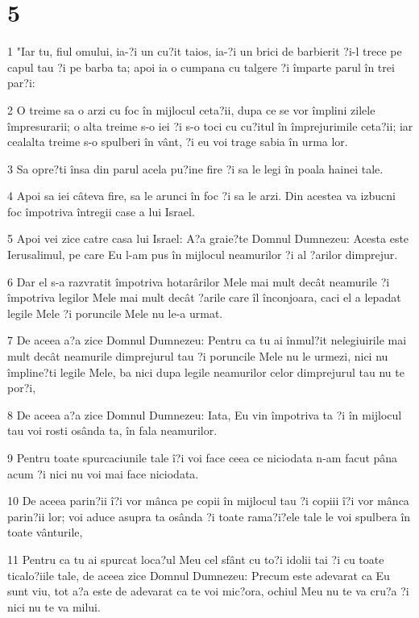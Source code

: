\chapter{5}

\par 1 "Iar tu, fiul omului, ia-?i un cu?it taios, ia-?i un brici de barbierit ?i-l trece pe capul tau ?i pe barba ta; apoi ia o cumpana cu talgere ?i împarte parul în trei par?i:
\par 2 O treime sa o arzi cu foc în mijlocul ceta?ii, dupa ce se vor împlini zilele împresurarii; o alta treime s-o iei ?i s-o toci cu cu?itul în împrejurimile ceta?ii; iar cealalta treime s-o spulberi în vânt, ?i eu voi trage sabia în urma lor.
\par 3 Sa opre?ti însa din parul acela pu?ine fire ?i sa le legi în poala hainei tale.
\par 4 Apoi sa iei câteva fire, sa le arunci în foc ?i sa le arzi. Din acestea va izbucni foc împotriva întregii case a lui Israel.
\par 5 Apoi vei zice catre casa lui Israel: A?a graie?te Domnul Dumnezeu: Acesta este Ierusalimul, pe care Eu l-am pus în mijlocul neamurilor ?i al ?arilor dimprejur.
\par 6 Dar el s-a razvratit împotriva hotarârilor Mele mai mult decât neamurile ?i împotriva legilor Mele mai mult decât ?arile care îl înconjoara, caci el a lepadat legile Mele ?i poruncile Mele nu le-a urmat.
\par 7 De aceea a?a zice Domnul Dumnezeu: Pentru ca tu ai înmul?it nelegiuirile mai mult decât neamurile dimprejurul tau ?i poruncile Mele nu le urmezi, nici nu împline?ti legile Mele, ba nici dupa legile neamurilor celor dimprejurul tau nu te por?i,
\par 8 De aceea a?a zice Domnul Dumnezeu: Iata, Eu vin împotriva ta ?i în mijlocul tau voi rosti osânda ta, în fala neamurilor.
\par 9 Pentru toate spurcaciunile tale î?i voi face ceea ce niciodata n-am facut pâna acum ?i nici nu voi mai face niciodata.
\par 10 De aceea parin?ii î?i vor mânca pe copii în mijlocul tau ?i copiii î?i vor mânca parin?ii lor; voi aduce asupra ta osânda ?i toate rama?i?ele tale le voi spulbera în toate vânturile,
\par 11 Pentru ca tu ai spurcat loca?ul Meu cel sfânt cu to?i idolii tai ?i cu toate ticalo?iile tale, de aceea zice Domnul Dumnezeu: Precum este adevarat ca Eu sunt viu, tot a?a este de adevarat ca te voi mic?ora, ochiul Meu nu te va cru?a ?i nici nu te va milui.
